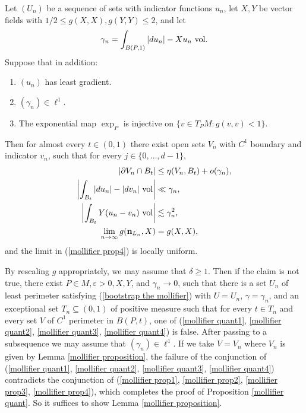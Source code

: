 \begin{lemma}\label{mollifier proposition}
Let $(U_n)$ be a sequence of sets with indicator functions $u_n$, let $X, Y$ be vector fields with $1/2 \leq g(X, X), g(Y, Y) \leq 2$, and let
$$\gamma_n = \int_{B(P, 1)} |du_n| - Xu_n ~\mathrm{vol}.$$
Suppose that in addition:
\begin{enumerate}
\item $(u_n)$ has least gradient.
\item $(\gamma_n) \in \ell^1$.
\item The exponential map $\exp_P$ is injective on $\{v \in T_PM: g(v, v) < 1\}$.
\end{enumerate}

Then for almost every $t \in (0, 1)$ there exist open sets $V_n$ with $C^1$ boundary and indicator $v_n$, such that for every $j \in \{0, \dots, d - 1\}$,
\begin{align}
|\partial V_n \cap B_t| &\leq \eta(V_n, B_t) + o(\gamma_n), \label{mollifier prop1}\\
\left|\int_{B_t} |du_n| - |dv_n| ~\mathrm{vol}\right| &\ll \gamma_n, \label{mollifier prop2}\\
\left|\int_{B_t} Y(u_n - v_n)~\mathrm{vol}\right| &\lesssim \gamma_n^2, \label{mollifier prop3}\\
\lim_{n \to \infty} g(\mathbf n_{L_n}, X) &= g(X, X), \label{mollifier prop4}
\end{align}
and the limit in (\ref{mollifier prop4}) is locally uniform.
\end{lemma}

By rescaling $g$ appropriately, we may assume that $\delta \geq 1$.
Then if the claim is not true, there exist $P \in M, \varepsilon > 0, X, Y$, and $\gamma_n \to 0$, such that there is a set $U_n$ of least perimeter satisfying (\ref{bootstrap the mollifier}) with $U = U_n$, $\gamma = \gamma_n$, and an exceptional set $T_n \subseteq (0, 1)$ of positive measure such that for every $t \in T_n$ and every set $V$ of $C^1$ perimeter in $B(P, t)$, one of (\ref{mollifier quant1}, \ref{mollifier quant2}, \ref{mollifier quant3}, \ref{mollifier quant4}) is false.
After passing to a subsequence we may assume that $(\gamma_n) \in \ell^1$.
If we take $V = V_n$ where $V_n$ is given by Lemma \ref{mollifier proposition}, the failure of the conjunction of (\ref{mollifier quant1}, \ref{mollifier quant2}, \ref{mollifier quant3}, \ref{mollifier quant4}) contradicts the conjunction of (\ref{mollifier prop1}, \ref{mollifier prop2}, \ref{mollifier prop3}, \ref{mollifier prop4}), which completes the proof of Proposition \ref{mollifier quant}.
So it suffices to show Lemma \ref{mollifier proposition}.

